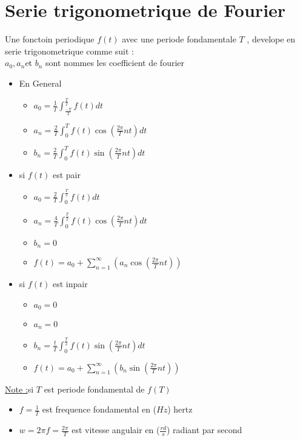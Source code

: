 \documentclass[12pt]{book}
\begin{document}
        \section{Serie trigonometrique de Fourier }
            Une fonctoin periodique $f(t)$ avec une periode fondamentale $T$ , develope en serie trigonometrique comme suit : 
             \\ 
            $a_0 , a_n $et $b_n$ sont nommes les coefficient de fourier
            \begin{itemize}
                \item En General
                    \begin{itemize}
                        \item $a_0 = \frac{1}{T}\int^{\frac{T}{2}}_{\frac{-T}{2}}f(t)dt$
                        \item $a_n = \frac{2}{T}\int^{T}_{0}f(t)\cos \left( \frac{2\pi}{T}nt \right) dt$
                        \item $b_n = \frac{2}{T}\int^{T}_{0}f(t)\sin \left( \frac{2\pi}{T}nt \right) dt$
                    \end{itemize}
                \item si $f(t)$ est pair
                    \begin{itemize}
                        \item $a_0 = \frac{2}{T}\int^{\frac{T}{2}}_{0}f(t)dt$
                        \item $a_n = \frac{4}{T}\int^{\frac{T}{2}}_{0}f(t)\cos \left( \frac{2\pi}{T}nt \right) dt$
                        \item $b_n = 0$
                        \item $f(t) = a_0 +\sum^\infty_{n=1}(a_n\cos(\frac{2\pi}{T}nt))$
                    \end{itemize}
                \item si $f(t)$ est inpair
                    \begin{itemize}
                        \item $a_0 = 0$
                        \item $a_n = 0$
                        \item $b_n = \frac{t}{T}\int^{\frac{T}{2}}_{0}f(t)\sin \left( \frac{2\pi}{T}nt \right) dt$
                        \item $f(t) = a_0 +\sum^\infty_{n=1}(b_n\sin(\frac{2\pi}{T}nt))$
                    \end{itemize}
            \end{itemize}
            \underline{Note :}si $T$ est periode fondamental de $f(T)$ \begin{itemize}
                \item $f = \frac{1}{T}$ est frequence fondamental en ($Hz$) hertz
                \item $w = 2\pi f =\frac{2\pi}{T}$ est vitesse angulair en ($\frac{rd}{s}$) radiant par second
            \end{itemize}
\end{document}
